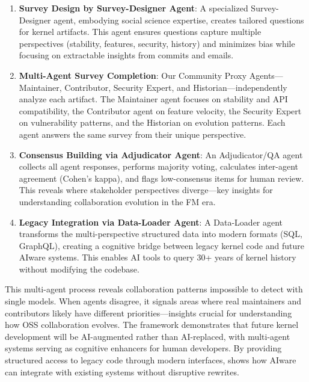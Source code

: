 \begin{enumerate}
    \item \textbf{Survey Design by Survey-Designer Agent}: A specialized Survey-Designer agent, embodying social science expertise, creates tailored questions for kernel artifacts. This agent ensures questions capture multiple perspectives (stability, features, security, history) and minimizes bias while focusing on extractable insights from commits and emails.

    \item \textbf{Multi-Agent Survey Completion}: Our Community Proxy Agents—Maintainer, Contributor, Security Expert, and Historian—independently analyze each artifact. The Maintainer agent focuses on stability and API compatibility, the Contributor agent on feature velocity, the Security Expert on vulnerability patterns, and the Historian on evolution patterns. Each agent answers the same survey from their unique perspective.

    \item \textbf{Consensus Building via Adjudicator Agent}: An Adjudicator/QA agent collects all agent responses, performs majority voting, calculates inter-agent agreement (Cohen's kappa), and flags low-consensus items for human review. This reveals where stakeholder perspectives diverge—key insights for understanding collaboration evolution in the FM era.

    \item \textbf{Legacy Integration via Data-Loader Agent}: A Data-Loader agent transforms the multi-perspective structured data into modern formats (SQL, GraphQL), creating a cognitive bridge between legacy kernel code and future AIware systems. This enables AI tools to query 30+ years of kernel history without modifying the codebase.

\end{enumerate}

This multi-agent process reveals collaboration patterns impossible to detect with single models. When agents disagree, it signals areas where real maintainers and contributors likely have different priorities—insights crucial for understanding how OSS collaboration evolves. The framework demonstrates that future kernel development will be AI-augmented rather than AI-replaced, with multi-agent systems serving as cognitive enhancers for human developers. By providing structured access to legacy code through modern interfaces, \sys shows how AIware can integrate with existing systems without disruptive rewrites.


